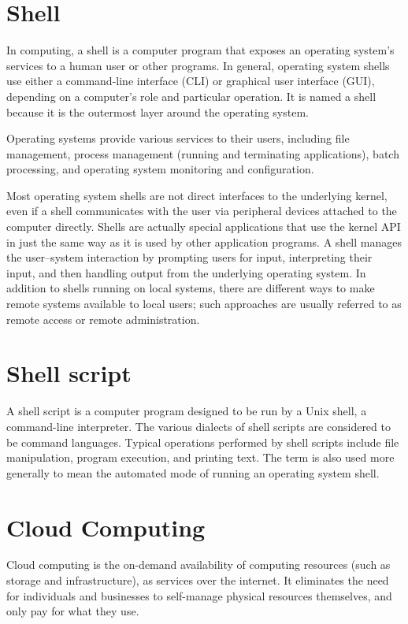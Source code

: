 \section{Shell}
	In computing, a shell \cite{shell} is a computer program that exposes an operating system's services to a human user or other programs. 
	In general, operating system shells use either a command-line interface (CLI) or graphical user interface (GUI), 
	depending on a computer's role and particular operation. It is named a shell because it is the outermost layer around the operating system.

	Operating systems provide various services to their users, including file management, process management (running and terminating applications), batch processing, and operating system monitoring and configuration.

	Most operating system shells are not direct interfaces to the underlying kernel, even if a shell communicates with the user via peripheral devices 
	attached to the computer directly. Shells are actually special applications that use the kernel API in just the same way as it is used by 
	other application programs. A shell manages the user–system interaction by prompting users for input, interpreting their input, and then 
	handling output from the underlying operating system. In addition to shells running on local systems, there are different ways to make remote 
	systems available to local users; such approaches are usually referred to as remote access or remote administration.

\section{Shell script}
	A shell script \cite{shellscript} is a computer program designed to be run by a Unix shell, a command-line interpreter. The various dialects of shell scripts 
	are considered to be command languages. Typical operations performed by shell scripts include file manipulation, program execution, and printing text.
	The term is also used more generally to mean the automated mode of running an operating system shell.

\section{Cloud Computing}
	Cloud computing \cite{cloud} is the on-demand availability of computing resources (such as storage and infrastructure), as services over the internet. 
	It eliminates the need for individuals and businesses to self-manage physical resources themselves, and only pay for what they use.

